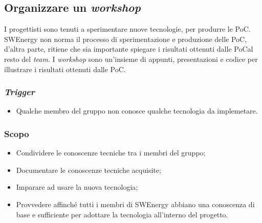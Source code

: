 \subsection{Organizzare un \textit{workshop}}
\label{organizzare-workshop}

I progettisti sono tenuti a sperimentare nuove tecnologie, per produrre le
PoC\g. SWEnergy non norma il processo di sperimentazione e produzione delle
PoC\g, d'altra parte, ritiene che sia importante spiegare i risultati ottenuti
dalle PoC\g al resto del \textit{team}. I \textit{workshop} sono un'insieme di
appunti, presentazioni e codice per illustrare i risultati ottenuti dalle
PoC\g.

\subsubsection{\textit{Trigger}}
\begin{itemize}
	\item Qualche membro del gruppo non conosce qualche tecnologia da
	      implemetare.
\end{itemize}

\subsubsection{Scopo}
\begin{itemize}
	\item Condividere le conoscenze tecniche tra i membri del gruppo;

	\item Documentare le conoscenze tecniche acquisite;

	\item Imparare ad usare la nuova tecnologia;

	\item Provvedere affinché tutti i membri di SWEnergy abbiano una conoscenza
	      di base e sufficiente per adottare la tecnologia all'interno del
	      progetto.
\end{itemize}

